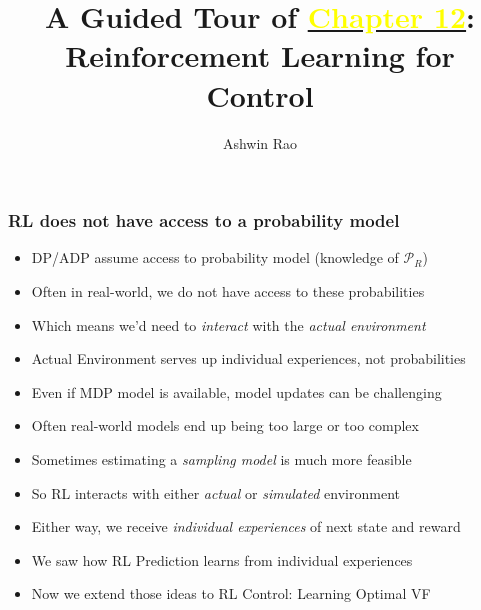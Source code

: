 \documentclass[handout]{beamer}
\title[RL Control Chapter]{A Guided Tour of \href{http://stanford.edu/~ashlearn/RLForFinanceBook/book.pdf}{\underline{\textcolor{yellow}{Chapter 12}}}: \\ Reinforcement Learning for Control} %
\author{Ashwin Rao} %
\institute[Stanford] %
{ICME, Stanford University
}
\date %
\begin{document}
\lstset{language=Python}  
\begin{frame}
\titlepage %
\end{frame}


\begin{frame}
\frametitle{RL does not have access to a probability model}
\begin{itemize}[<+->]
\item DP/ADP assume access to probability model (knowledge of $\mathcal{P}_R$)
\item Often in real-world, we do not have access to these probabilities
\item Which means we'd need to {\em interact} with the {\em actual environment}
\item {Actual Environment} serves up individual experiences, not probabilities
\item Even if MDP model is available, model updates can be challenging
\item Often real-world models end up being too large or too complex
\item Sometimes estimating a {\em sampling model} is much more feasible
\item So RL interacts with either {\em actual} or {\em simulated} environment
\item Either way, we receive {\em individual experiences} of next state and reward
\item We saw how RL Prediction learns from individual experiences
\item Now we extend those ideas to RL Control: Learning Optimal VF
 \end{itemize}
\end{frame}
\end{document}
